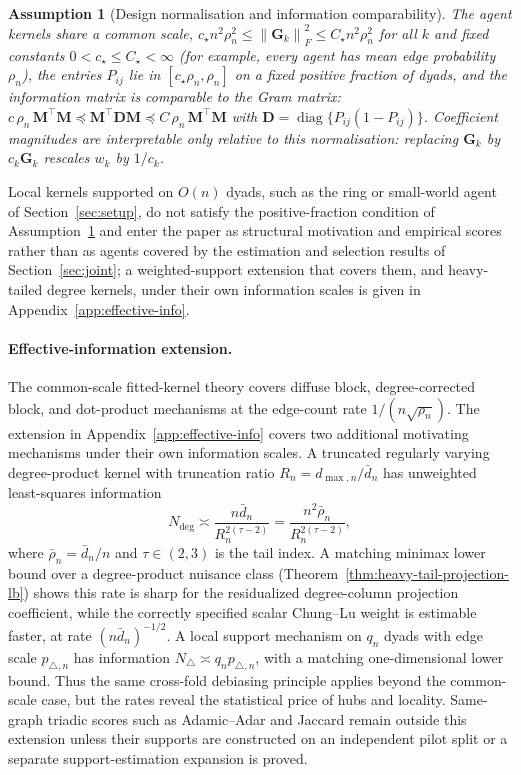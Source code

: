 \documentclass[12pt]{article}
\newtheorem{assumption}{Assumption}
\newcommand{\1}{\mathbf{1}}
\newcommand{\norm}[1]{\left\lVert#1\right\rVert}
\begin{document}
\begin{assumption}[Design normalisation and information comparability]\label{ass:norm}
The agent kernels share a common scale, $c_\star n^2\rho_n^2\le\norm{\mathbf{G}_k}_F^2\le
C_\star n^2\rho_n^2$ for all $k$ and fixed constants $0<c_\star\le C_\star<\infty$ (for
example, every agent has mean edge probability $\rho_n$), the entries $P_{ij}$ lie in
$[c_\star\rho_n,\rho_n]$ on a fixed positive fraction of dyads, and the information matrix is
comparable to the Gram matrix:
$c\,\rho_n\,\mathbf{M}^\top\mathbf{M}\preceq\mathbf{M}^\top\mathbf{D}\mathbf{M}\preceq
C\,\rho_n\,\mathbf{M}^\top\mathbf{M}$ with
$\mathbf{D}=\operatorname{diag}\{P_{ij}(1-P_{ij})\}$. Coefficient magnitudes are interpretable
only relative to this normalisation: replacing $\mathbf{G}_k$ by $c_k\mathbf{G}_k$ rescales
$w_k$ by $1/c_k$.
\end{assumption}

Local kernels supported on $O(n)$ dyads, such as the ring or small-world agent of
Section~\ref{sec:setup}, do not satisfy the positive-fraction condition of
Assumption~\ref{ass:norm} and enter the paper as structural motivation and empirical scores rather
than as agents covered by the estimation and selection results of Section~\ref{sec:joint}; a
weighted-support extension that covers them, and heavy-tailed degree kernels, under their own
information scales is given in Appendix~\ref{app:effective-info}.

\paragraph{Effective-information extension.}
The common-scale fitted-kernel theory covers diffuse block, degree-corrected
block, and dot-product mechanisms at the edge-count rate
$1/(n\sqrt{\rho_n})$. The extension in Appendix~\ref{app:effective-info}
covers two additional motivating mechanisms under their own information
scales. A truncated regularly varying degree-product kernel with truncation
ratio $R_n=d_{\max,n}/\bar d_n$ has unweighted least-squares information
\[
    N_{\deg}
    \asymp
    \frac{n\bar d_n}{R_n^{2(\tau-2)}}
    =
    \frac{n^2\bar\rho_n}{R_n^{2(\tau-2)}},
\]
where $\bar\rho_n=\bar d_n/n$ and $\tau\in(2,3)$ is the tail index. A matching minimax lower bound over a degree-product nuisance class
(Theorem~\ref{thm:heavy-tail-projection-lb}) shows this rate is sharp for the residualized degree-column
projection coefficient, while the correctly specified scalar Chung--Lu weight is estimable faster, at rate
$(n\bar d_n)^{-1/2}$. A local
support mechanism on $q_n$ dyads with edge scale $p_{\triangle,n}$ has
information $N_\triangle\asymp q_np_{\triangle,n}$, with a matching one-dimensional
lower bound. Thus the same cross-fold debiasing principle applies beyond the
common-scale case, but the rates reveal the statistical price of hubs and
locality. Same-graph triadic scores such as Adamic--Adar and Jaccard remain
outside this extension unless their supports are constructed on an independent
pilot split or a separate support-estimation expansion is proved.
\end{document}
